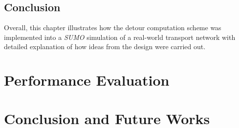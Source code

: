 \documentclass[11pt]{report}
\begin{document}
\section{Conclusion}

Overall, this chapter illustrates how the detour computation scheme was implemented into a \emph{SUMO} simulation of a real-world transport network with detailed explanation of how ideas from the design were carried out.

\newpage 

\chapter{Performance Evaluation}

\newpage

\chapter{Conclusion and Future Works}

\newpage

\newpage

\printbibliography

\newpage

\listoffigures

\newpage

\listoftables

\newpage

\lstlistoflistings
\end{document}
